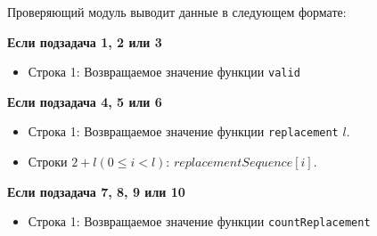 Проверяющий модуль выводит данные в следующем формате:

\textbf{Если подзадача 1, 2 или 3}
\begin{itemize}
\item Строка 1: Возвращаемое значение функции \texttt{valid}
\end{itemize}

\textbf{Если подзадача 4, 5 или 6}
\begin{itemize}
\item Строка 1: Возвращаемое значение функции \texttt{replacement} $l$.
\item Строки $2 + l (0 \le i < l)$: $replacementSequence[i]$.
\end{itemize}

\textbf{Если подзадача 7, 8, 9 или 10}
\begin{itemize}
\item Строка 1: Возвращаемое значение функции \texttt{countReplacement}
\end{itemize}
